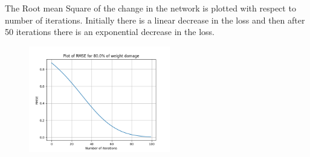 \documentclass{article}
\begin{document}
\begin{figure}[H]
\hspace{0.001\textwidth}
\end{figure}


The Root mean Square of the change in the network is plotted with respect to number of iterations. Initially there is a linear decrease in the loss and then after 50 iterations there is an exponential decrease in the loss.
\begin{figure}[H]
\includegraphics[width=0.55\textwidth]{Mona_43.png}
\centering
\end{figure}

\end{document}
